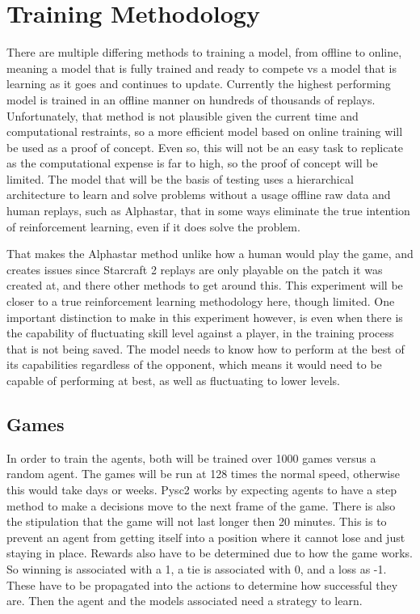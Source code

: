 \section{Training Methodology}
\label{sec:Training Methodology}


There are multiple differing methods to training a model, from offline to online, meaning a model that is fully trained and ready to compete vs a model that is learning as it goes and continues to update. Currently the highest performing model is trained in an
offline manner on hundreds of thousands of replays\cite{starcraft_unplugged}. Unfortunately, that method is not plausible given the current time and computational restraints, so a more efficient model based on online training will be used as a proof of concept. 
Even so, this will not be an easy task to replicate as the computational expense is far to high, so the proof of concept will be limited. The model that will be the basis of testing uses a hierarchical architecture to learn and solve problems without a usage offline
raw data and human replays, such as Alphastar, that in some ways eliminate the true intention of reinforcement learning, even if it does solve the problem\cite{Liu2022OnER}.

That makes the Alphastar method unlike how a human would play the game, and creates issues since Starcraft 2 replays are only playable on the patch it was created at, and there other methods to get around this. This experiment will be closer to a true reinforcement
learning methodology here, though limited. One important distinction to make in this experiment however, is even when there is the capability of fluctuating skill level against a player, in the training process that is not being saved. The model needs to know how 
to perform at the best of its capabilities regardless of the opponent, which means it would need to be capable of performing at best, as well as fluctuating to lower levels.

\subsection{Games}
In order to train the agents, both will be trained over 1000 games versus a random agent. The games will be run at 128 times the normal speed, otherwise this would take days or weeks. Pysc2 works by expecting agents to have a step method to make a decisions 
move to the next frame of the game. There is also the stipulation that the game will not last longer then 20 minutes. This is to prevent an agent from getting itself into a position where it cannot lose and just staying in place. Rewards also have to be determined
due to how the game works. So winning is associated with a 1, a tie is associated with 0, and a loss as -1. These have to be propagated into the actions to determine how successful they are. Then the agent and the models associated need a strategy to learn.

